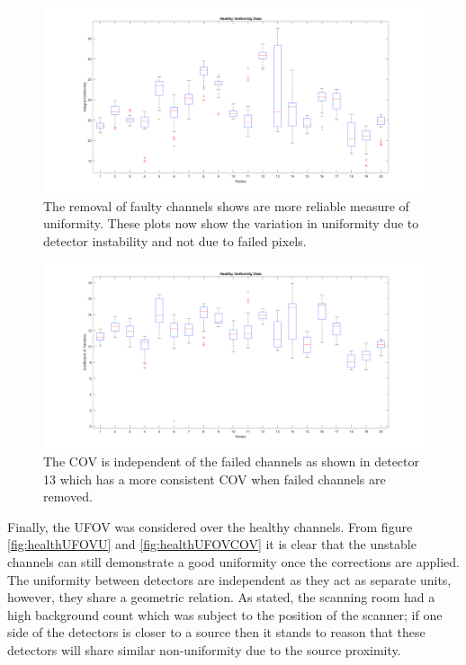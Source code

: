 \begin{figure}[!t]
\centering
\includegraphics[width=5.6in]{figures/FixUBox.png}

    \caption{The removal of faulty channels shows are more reliable measure of uniformity. These plots now show the variation in uniformity due to detector instability and not due to failed pixels.} \label{fig:HealthUI}
\end{figure}

\begin{figure}[!t]
\centering
\includegraphics[width=5.6in]{figures/FixCOVBox.png}

    \caption{The \acrshort{COV} is independent of the failed channels as shown in detector 13 which has a more consistent \acrshort{COV} when failed channels are removed.} \label{fig:HealthCOV}
\end{figure}

Finally, the \acrshort{UFOV} was considered over the healthy channels. From figure \ref{fig:healthUFOVU} and \ref{fig:healthUFOVCOV} it is clear that the unstable channels can still demonstrate a good uniformity once the corrections are applied. The uniformity between detectors are independent as they act as separate units, however, they share a geometric relation. As stated, the scanning room had a high background count which was subject to the position of the scanner; if one side of the detectors is closer to a source then it stands to reason that these detectors will share similar non-uniformity due to the source proximity. 


